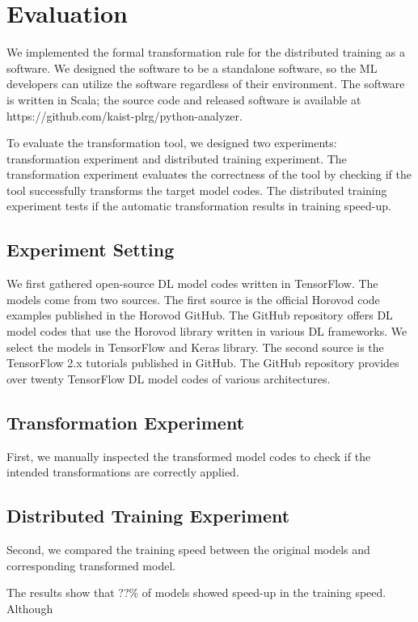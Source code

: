\section{Evaluation}\label{sec:eval}

We implemented the formal transformation rule for the distributed training
as a software. We designed the software to be a standalone software, so 
the ML developers can utilize the software regardless of their environment. 
The software is written in Scala; the source code and released software
is available at https://github.com/kaist-plrg/python-analyzer. 

To evaluate the transformation tool,
we designed two experiments: transformation experiment and
distributed training experiment.
The transformation experiment evaluates the correctness of the tool
by checking if the tool successfully transforms the target model codes.
The distributed training experiment tests if the automatic transformation
results in training speed-up.   

\subsection{Experiment Setting}

We first gathered open-source DL model codes written in TensorFlow. 
The models come from two sources. The first source is the official
Horovod code examples published in the Horovod GitHub\cite{horovodgithub}. 
The GitHub repository offers DL model codes that use the Horovod library
written in various DL frameworks. We select the models in TensorFlow and
Keras library. The second source is the TensorFlow 2.x tutorials published in
GitHub\cite{tf2tutogithub}. The GitHub repository provides over twenty
TensorFlow DL model codes of various architectures.


\subsection{Transformation Experiment}

First, we manually inspected the transformed model codes to check if the 
intended transformations are correctly applied.  

\subsection{Distributed Training Experiment}

Second, we compared the training speed between the original models and
corresponding transformed model. 

The results show that ??\% of models showed speed-up in the training speed.
Although  
